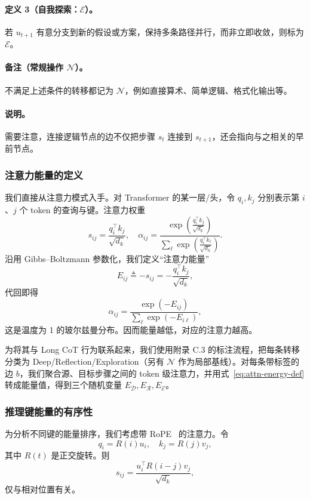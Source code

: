 \paragraph{定义 3（自我探索：\(\mathcal{E}\)）。}
若 \(u_{t+1}\) 有意分支到新的假设或方案，保持多条路径并行，而非立即收敛，则标为 \(\mathcal{E}\)。

\paragraph{备注（常规操作 \(\mathcal{N}\)）。}
不满足上述条件的转移都记为 \(\mathcal{N}\)，例如直接算术、简单逻辑、格式化输出等。

\paragraph{说明。} 需要注意，连接逻辑节点的边不仅把步骤 $s_t$ 连接到 $s_{t+1}$，还会指向与之相关的早前节点。

\subsubsection{注意力能量的定义}
我们直接从注意力模式入手。对 Transformer 的某一层/头，令 $q_i,k_j$ 分别表示第 $i$、$j$ 个 token 的查询与键。注意力权重
\begin{equation}
    s_{ij} = \frac{q_i^\top k_j}{\sqrt{d_k}}, \quad
    \alpha_{ij} = \frac{\exp (\frac{q_i^\top k_j}{\sqrt{d_k}})}{\sum_{\ell}\exp (\frac{q_i^\top k_\ell}{\sqrt{d_k}})}.
\end{equation}
沿用 Gibbs–Boltzmann 参数化，我们定义“注意力能量”
\begin{equation}
E_{ij} \triangleq -s_{ij} = -\frac{q_i^\top k_j}{\sqrt{d_k}},
\label{eq:attn-energy-def}
\end{equation}
代回即得
\begin{equation}
\alpha_{ij} = \frac{\exp(-E_{ij})}{\sum_{\ell}\exp(-E_{i\ell})},
\end{equation}
这是温度为 1 的玻尔兹曼分布。因而能量越低，对应的注意力越高。

为将其与 Long CoT 行为联系起来，我们使用附录 C.3 的标注流程，把每条转移分类为 Deep/Reflection/Exploration（另有 \(\mathcal{N}\) 作为局部基线）。对每条带标签的边 $b$，我们聚合源、目标步骤之间的 token 级注意力，并用式~\eqref{eq:attn-energy-def} 转成能量值，得到三个随机变量 $E_{\mathcal{D}},E_{\mathcal{R}},E_{\mathcal{E}}$。

\subsubsection{推理键能量的有序性}
为分析不同键的能量排序，我们考虑带 RoPE~\citep{su2024roformer} 的注意力。令
\begin{equation}
q_i = R(i)u_i, \quad k_j = R(j)v_j,
\end{equation}
其中 $R(t)$ 是正交旋转。则
\begin{equation}
s_{ij} = \frac{u_i^\top R(i-j)v_j}{\sqrt{d_k}},
\end{equation}
仅与相对位置有关。

